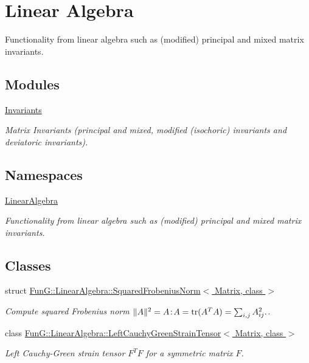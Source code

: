 \hypertarget{group__LinearAlgebraGroup}{\section{Linear Algebra}
\label{group__LinearAlgebraGroup}
}


Functionality from linear algebra such as (modified) principal and mixed matrix invariants.  


\subsection*{Modules}
\begin{DoxyCompactItemize}
\item 
\hyperlink{group__InvariantGroup}{Invariants}
\begin{DoxyCompactList}\small\item\em Matrix Invariants (principal and mixed, modified (isochoric) invariants and deviatoric invariants). \end{DoxyCompactList}\end{DoxyCompactItemize}
\subsection*{Namespaces}
\begin{DoxyCompactItemize}
\item 
\hyperlink{namespaceLinearAlgebra}{Linear\-Algebra}
\begin{DoxyCompactList}\small\item\em Functionality from linear algebra such as (modified) principal and mixed matrix invariants. \end{DoxyCompactList}\end{DoxyCompactItemize}
\subsection*{Classes}
\begin{DoxyCompactItemize}
\item 
struct \hyperlink{structFunG_1_1LinearAlgebra_1_1SquaredFrobeniusNorm}{Fun\-G\-::\-Linear\-Algebra\-::\-Squared\-Frobenius\-Norm$<$ Matrix, class $>$}
\begin{DoxyCompactList}\small\item\em Compute squared Frobenius norm $ \|A\|^2 = A\negthinspace : \negthinspace A = \mathrm{tr}(A^TA) = \sum_{i,j} A_{ij}^2. $. \end{DoxyCompactList}\item 
class \hyperlink{classFunG_1_1LinearAlgebra_1_1LeftCauchyGreenStrainTensor}{Fun\-G\-::\-Linear\-Algebra\-::\-Left\-Cauchy\-Green\-Strain\-Tensor$<$ Matrix, class $>$}
\begin{DoxyCompactList}\small\item\em Left Cauchy-\/\-Green strain tensor $ F^T F $ for a symmetric matrix $ F $. \end{DoxyCompactList}\end{DoxyCompactItemize}
